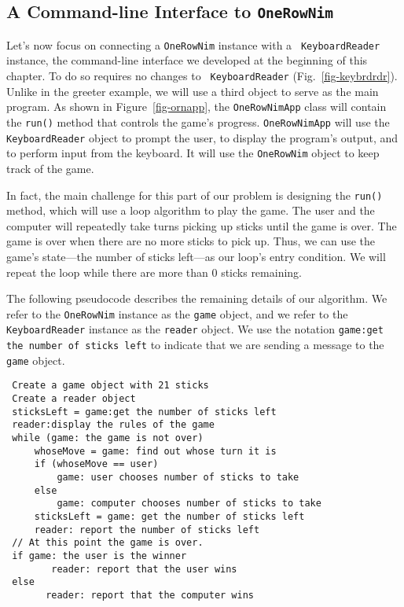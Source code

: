 \subsection{A Command-line Interface to {\tt OneRowNim}}

Let's now focus on connecting a {\tt OneRowNim} instance with a {\tt
Key\-board\-Read\-er} instance, the command-line interface we developed at the
beginning of this chapter. To do so requires no changes to {\tt
KeyboardReader} (Fig.~\ref{fig-keybrdrdr}). Unlike in the greeter
example, we will use a third object to serve as the main program. As
shown in Figure~\ref{fig-ornapp}, the {\tt OneRowNimApp} class
will contain the {\tt run()} method that controls the game's progress.
{\tt OneRowNimApp} will use the {\tt KeyboardReader} object to prompt
the user, to display the program's output, and to perform input from
the keyboard. It will use the {\tt OneRowNim} object to keep track of
the game.

In fact, the main challenge for this part of our problem is designing
the {\tt run()} method, which will use a loop algorithm to play the
game. The user and the computer will repeatedly take turns picking up
sticks until the game is over. The game is over when there are no more
sticks to pick up. Thus, we can use the game's state---the number of
sticks left---as our loop's entry condition.  We will repeat the loop
while there are more than 0 sticks remaining.

The following pseudocode describes the remaining details of our
algorithm. We refer to the {\tt OneRowNim} instance as the {\tt game} object,
and we refer to the {\tt KeyboardReader} instance as the {\tt reader}
object. We use the notation {\tt game:get the number of sticks left} to
indicate that we are sending a message to the {\tt game} object.

\begin{jjjlisting}
\begin{lstlisting}
 Create a game object with 21 sticks
 Create a reader object
 sticksLeft = game:get the number of sticks left
 reader:display the rules of the game 
 while (game: the game is not over)       
     whoseMove = game: find out whose turn it is
     if (whoseMove == user)
         game: user chooses number of sticks to take
     else
         game: computer chooses number of sticks to take 
     sticksLeft = game: get the number of sticks left
     reader: report the number of sticks left
 // At this point the game is over.
 if game: the user is the winner
        reader: report that the user wins
 else 
       reader: report that the computer wins
\end{lstlisting}
\end{jjjlisting}

